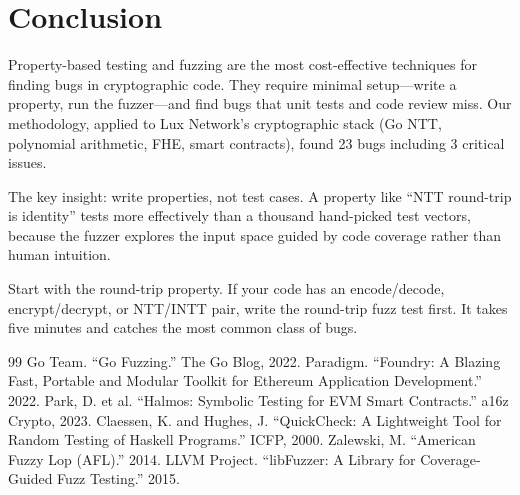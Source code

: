 \section{Conclusion}


Property-based testing and fuzzing are the most cost-effective techniques for finding
bugs in cryptographic code. They require minimal setup---write a property, run the
fuzzer---and find bugs that unit tests and code review miss. Our methodology, applied to
Lux Network's cryptographic stack (Go NTT, polynomial arithmetic, FHE, smart contracts),
found 23 bugs including 3 critical issues.

The key insight: write properties, not test cases. A property like ``NTT round-trip is
identity'' tests more effectively than a thousand hand-picked test vectors, because the
fuzzer explores the input space guided by code coverage rather than human intuition.

Start with the round-trip property. If your code has an encode/decode, encrypt/decrypt,
or NTT/INTT pair, write the round-trip fuzz test first. It takes five minutes and catches
the most common class of bugs.

\begin{thebibliography}{99}
 Go Team. ``Go Fuzzing.'' The Go Blog, 2022.
 Paradigm. ``Foundry: A Blazing Fast, Portable and Modular Toolkit for Ethereum Application Development.'' 2022.
 Park, D. et al. ``Halmos: Symbolic Testing for EVM Smart Contracts.'' a16z Crypto, 2023.
 Claessen, K. and Hughes, J. ``QuickCheck: A Lightweight Tool for Random Testing of Haskell Programs.'' ICFP, 2000.
 Zalewski, M. ``American Fuzzy Lop (AFL).'' 2014.
 LLVM Project. ``libFuzzer: A Library for Coverage-Guided Fuzz Testing.'' 2015.
\end{thebibliography}

